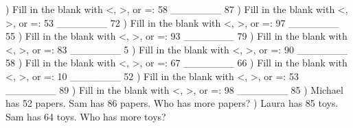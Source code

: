 \documentclass{article}%
\begin{document}
\newline%
) Fill in the blank with <, >, or =: 58 \_\_\_\_\_\_\_ 87%
\newline%
\newline%
) Fill in the blank with <, >, or =: 53 \_\_\_\_\_\_\_ 72%
\newline%
\newline%
) Fill in the blank with <, >, or =: 97 \_\_\_\_\_\_\_ 55%
\newline%
\newline%
) Fill in the blank with <, >, or =: 93 \_\_\_\_\_\_\_ 79%
\newline%
\newline%
) Fill in the blank with <, >, or =: 83 \_\_\_\_\_\_\_ 5%
\newline%
\newline%
) Fill in the blank with <, >, or =: 90 \_\_\_\_\_\_\_ 58%
\newline%
\newline%
) Fill in the blank with <, >, or =: 67 \_\_\_\_\_\_\_ 66%
\newline%
\newline%
) Fill in the blank with <, >, or =: 10 \_\_\_\_\_\_\_ 52%
\newline%
\newline%
) Fill in the blank with <, >, or =: 53 \_\_\_\_\_\_\_ 89%
\newline%
\newline%
) Fill in the blank with <, >, or =: 98 \_\_\_\_\_\_\_ 85%
\newline%
\newline%
) Michael has 52 papers. Sam has 86 papers. Who has more papers?%
\newline%
\newline%
) Laura has 85 toys. Sam has 64 toys. Who has more toys?%
\newline%
\newline%
\newline%
\end{document}
